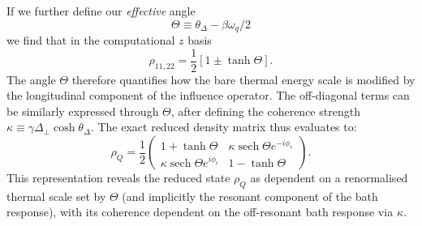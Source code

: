 If we further define our \emph{effective} angle
\begin{equation}
\Theta \equiv \theta_\Delta - \beta\omega_q/2
\end{equation}
we find that in the computational $z$ basis
\begin{equation}
\rho_{11,22} = \frac{1}{2}[1 \pm \tanh \Theta].
\end{equation}
The angle $\Theta$ therefore quantifies how the bare thermal energy scale is modified by the longitudinal component of the influence operator. The off-diagonal terms can be similarly expressed through $\Theta$, after defining the coherence strength $\kappa \equiv \gamma \Delta_\perp \cosh \theta_\Delta$. The exact reduced density matrix thus evaluates to:
\begin{equation}
    \rho_Q = \frac{1}{2} \begin{pmatrix} 
        1 + \tanh\Theta & \kappa \operatorname{sech}\Theta e^{-i\phi_r} \\
        \kappa \operatorname{sech}\Theta e^{i\phi_r} & 1 - \tanh\Theta
    \end{pmatrix}.
    \label{eq:rho_matrix_general}
\end{equation}
This representation reveals the reduced state $\rho_Q$ as dependent on a renormalised thermal scale set by $\Theta$ (and implicitly the resonant component of the bath response), with its coherence dependent on the off-resonant bath response via $\kappa$. 

